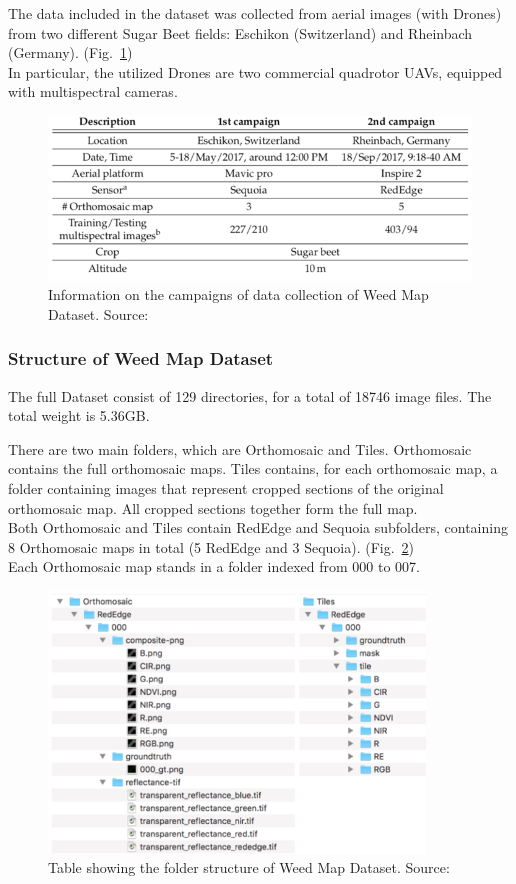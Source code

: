 The data included in the dataset was collected from aerial images (with Drones) from two different Sugar Beet fields: Eschikon (Switzerland) and Rheinbach (Germany). (Fig.~\ref{fig:figure-4.5.2})
\\[0.3cm]In particular, the utilized Drones are two commercial quadrotor UAVs, equipped with multispectral cameras.
\begin{figure}[t]
	\centering
	\includegraphics[width=13cm]{figures/figure-4.5.2.png}
	\caption[Information on Campaigns of Weed Map Dataset]{Information on the campaigns of data collection of Weed Map Dataset. Source:~\cite{Tesi-2.1}}
	\label{fig:figure-4.5.2}
\end{figure}

\subsubsection{Structure of Weed Map Dataset}

The full Dataset consist of 129 directories, for a total of 18746 image files. The total weight is 5.36GB.

There are two main folders, which are Orthomosaic and Tiles.
Orthomosaic contains the full orthomosaic maps.
Tiles contains, for each orthomosaic map, a folder containing images that represent cropped sections of the original orthomosaic map. All cropped sections together form the full map.
\\[0.3cm]Both Orthomosaic and Tiles contain RedEdge and Sequoia subfolders, containing 8 Orthomosaic maps in total (5 RedEdge and 3 Sequoia). (Fig.~\ref{fig:figure-4.5.3})
\\[0.3cm]Each Orthomosaic map stands in a folder indexed from 000 to 007.
\begin{figure}[t]
	\centering
	\includegraphics[width=10cm]{figures/figure-4.5.3.png}
	\caption[Folder Structure Weed Map Dataset]{Table showing the folder structure of Weed Map Dataset. Source:~\cite{Tesi-2.1}}
	\label{fig:figure-4.5.3}
\end{figure}

